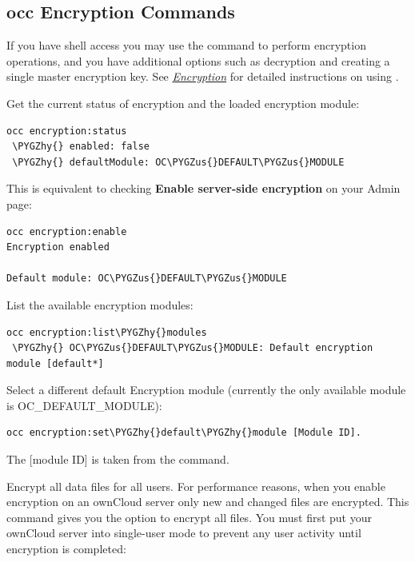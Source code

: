 \documentclass[letterpaper,10pt,english]{sphinxmanual}
\def\PYGZus{\char`\_}
\def\PYGZhy{\char`\-}
\begin{document}
\subsection{occ Encryption Commands}
\label{configuration_files/encryption_configuration:occ-encryption-label}\label{configuration_files/encryption_configuration:occ-encryption-commands}
If you have shell access you may use the  command to perform encryption
operations, and you have additional options such as decryption and creating a
single master encryption key. See {\hyperref[configuration_server/occ_command:encryption-label]{\emph{Encryption}}}  for detailed
instructions on using .

Get the current status of encryption and the loaded encryption module:

\begin{Verbatim}[commandchars=\\\{\}]
occ encryption:status
 \PYGZhy{} enabled: false
 \PYGZhy{} defaultModule: OC\PYGZus{}DEFAULT\PYGZus{}MODULE
\end{Verbatim}

This is equivalent to checking \textbf{Enable server-side encryption} on your Admin
page:

\begin{Verbatim}[commandchars=\\\{\}]
occ encryption:enable
Encryption enabled

Default module: OC\PYGZus{}DEFAULT\PYGZus{}MODULE
\end{Verbatim}

List the available encryption modules:

\begin{Verbatim}[commandchars=\\\{\}]
occ encryption:list\PYGZhy{}modules
 \PYGZhy{} OC\PYGZus{}DEFAULT\PYGZus{}MODULE: Default encryption module [default*]
\end{Verbatim}

Select a different default Encryption module (currently the only available
module is OC\_DEFAULT\_MODULE):

\begin{Verbatim}[commandchars=\\\{\}]
occ encryption:set\PYGZhy{}default\PYGZhy{}module [Module ID].
\end{Verbatim}

The {[}module ID{]} is taken from the  command.

Encrypt all data files for all users. For performance reasons, when you enable
encryption on an ownCloud server only new and changed files are encrypted. This
command gives you the option to encrypt all files. You must first put your
ownCloud server into single-user mode to prevent any user activity until
encryption is completed:
\end{document}
